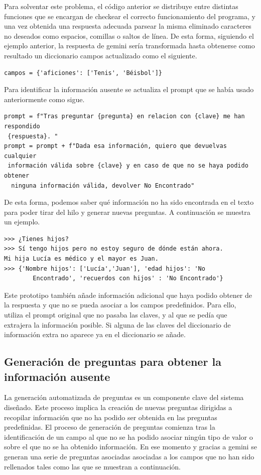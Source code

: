Para solventar este problema, el código anterior se distribuye entre distintas funciones que se encargan de checkear el correcto funcionamiento del programa, y una vez obtenida una respuesta adecuada parsear la misma eliminado caracteres no deseados como espacios, comillas o saltos de línea. De esta forma, siguiendo el ejemplo anterior, la respuesta de gemini sería transformada hasta obtenerse como resultado un diccionario campos actualizado como el siguiente.  
\begin{verbatim}
campos = {'aficiones': ['Tenis', 'Béisbol']}
\end{verbatim}

Para identificar la información ausente se actualiza el prompt que se había usado anteriormente como sigue.  

\begin{verbatim}
prompt = f"Tras preguntar {pregunta} en relacion con {clave} me han respondido
 {respuesta}. "
prompt = prompt + f"Dada esa información, quiero que devuelvas cualquier
 información válida sobre {clave} y en caso de que no se haya podido obtener
  ninguna información válida, devolver No Encontrado"
\end{verbatim}
De esta forma, podemos saber qué información no ha sido encontrada en el texto para poder tirar del hilo y generar nuevas preguntas. A continuación se muestra un ejemplo.
\begin{verbatim}
>>>	¿Tienes hijos?
>>> Sí tengo hijos pero no estoy seguro de dónde están ahora.
Mi hija Lucía es médico y el mayor es Juan.
>>> {'Nombre hijos': ['Lucía','Juan'], 'edad hijos': 'No
		Encontrado', 'recuerdos con hijos' : 'No Encontrado'}
\end{verbatim}

Este prototipo también añade información adicional que haya podido obtener de la respuesta y que no se pueda asociar a los campos predefinidos. Para ello, utiliza el prompt original que no pasaba las claves, y al que se pedía que extrajera la información posible. Si alguna de las claves del diccionario de información extra no aparece ya en el diccionario se añade. 

\subsection{Generación de preguntas para obtener la información ausente}
La generación automatizada de preguntas es un componente clave del sistema diseñado. Este proceso implica la creación de nuevas preguntas dirigidas a recopilar información que no ha podido ser obtenida en las preguntas predefinidas. El proceso de generación de preguntas comienza tras la identificación de un campo al que no se ha podido asociar ningún tipo de valor o sobre el que no se ha obtenido información. En ese momento y gracias a gemini se generan una serie de preguntas asociadas asociadas a los campos que no han sido rellenados tales como las que se muestran a continuación.  

